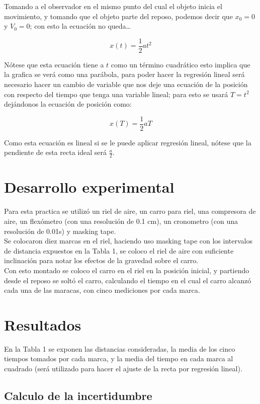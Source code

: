 \documentclass[12pt,a4paper]{article}
\begin{document}
Tomando a el observador en el mismo punto del cual el objeto inicia el movimiento, y tomando que el objeto parte del reposo, podemos decir que $x_0 = 0$ y $V_0 = 0$; con esto la ecuación no queda…

\[x(t) = \frac{1}{2} a t^2\]

Nótese que esta ecuación tiene a $t$ como un término cuadrático esto implica que la grafica se verá como una parábola, para poder hacer la regresión lineal será necesario hacer un cambio de variable que nos deje una ecuación de la posición con respecto del tiempo que tenga una variable lineal; para esto se usará $T = t^2$ dejándonos la ecuación de posición como:

\[x(T) = \frac{1}{2} a T\]

Como esta ecuación es lineal si se le puede aplicar regresión lineal, nótese que la pendiente de esta recta ideal será $\frac{a}{2}$. 

\section{Desarrollo experimental}

Para esta practica se utilizó un riel de aire, un carro para riel, una compresora de aire, un flexómetro (con una resolución de 0.1 cm), un cronometro (con una resolución de 0.01s) y masking tape.\\
Se colocaron diez marcas en el riel, haciendo uso masking tape con los intervalos de distancia expuestos en la Tabla 1, se coloco el riel de aire con suficiente inclinación para notar los efectos de la gravedad sobre el carro.\\
Con esto montado se coloco el carro en el riel en la posición inicial, y partiendo desde el reposo se soltó el carro, calculando el tiempo en el cual el carro alcanzó cada una de las maracas, con cinco mediciones por cada marca.  \\

\section{Resultados}

En la Tabla 1 se exponen las distancias consideradas, la media de los cinco tiempos tomados por cada marca, y la media del tiempo en cada marca al cuadrado (será utilizado para hacer el ajuste de la recta por regresión lineal).

\subsection{Calculo de la incertidumbre}
\end{document}
